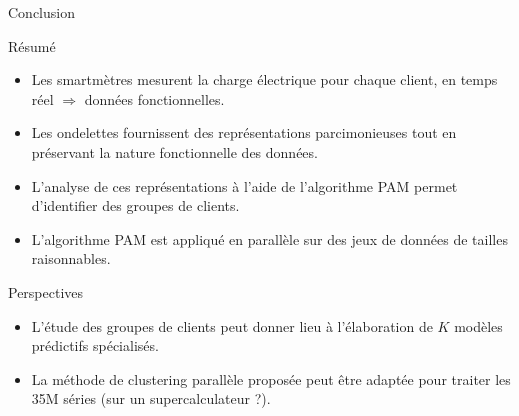 \begin{frame}{Conclusion}


\begin{block}{Résumé}
\begin{itemize}
\itemsep0.1em
\item Les smartmètres mesurent la charge électrique pour chaque client, en temps réel $\Rightarrow$ données fonctionnelles.
\item Les ondelettes fournissent des représentations parcimonieuses tout en préservant la nature fonctionnelle des données.
\item L'analyse de ces représentations à l'aide de l'algorithme PAM permet d'identifier des groupes de clients.
\item L'algorithme PAM est appliqué en parallèle sur des jeux de données de tailles raisonnables.
\end{itemize}
\end{block}


\begin{exampleblock}{Perspectives}
\begin{itemize}
\itemsep0.1em
\item L'étude des groupes de clients peut donner lieu à l'élaboration de $K$ modèles prédictifs spécialisés.
\item La méthode de clustering parallèle proposée peut être adaptée pour traiter les 35M séries (sur un supercalculateur ?).
\end{itemize}
\end{exampleblock}

\end{frame}

